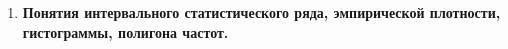 \documentclass[12pt]{report}
\begin{document}
\begin{enumerate}
\begin{figure}[!h]
	\end{figure}
	\begin{figure}[!h]
	\end{figure}

	\item \textbf{Понятия интервального статистического ряда, эмпирической плотности, гистограммы, полигона частот.}
	

\end{enumerate}
\end{document}

